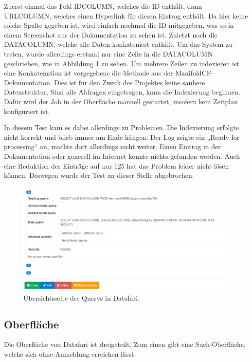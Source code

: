 Zuerst einmal das Feld IDCOLUMN, welches die ID enthält, dann URLCOLUMN, welches einen Hyperlink für diesen Eintrag enthält. Da hier keine solche Spalte gegeben ist, wird einfach nochmal die ID mitgegeben, was so in einem Screenshot aus der Dokumentation zu sehen ist. Zuletzt noch die DATACOLUMN, welche alle Daten konkateniert enthält. Um das System zu testen, wurde allerdings erstmal nur eine Zeile in die DATACOLUMN geschrieben, wie in Abbildung \ref{img:datafariQuery} zu sehen. Um mehrere Zeilen zu indexieren ist eine Konkatenation ist vorgegebene die Methode aus der ManifoldCF-Dokumentation. \cite[S.~97]{ApacheSoftwareFoundation.} Dies ist für den Zweck des Projektes keine saubere Datenstruktur.
Sind alle Abfragen eingetragen, kann die Indexierung beginnen. Dafür wird der Job in der Oberfläche manuell gestartet, insofern kein Zeitplan konfiguriert ist. \cite{datafari.25.2.2020}

In diesem Test kam es dabei allerdings zu Problemen. Die Indexierung erfolgte nicht korrekt und blieb immer am Ende hängen. Der Log zeigte ein „Ready for processing“ an, machte dort allerdings nicht weiter. Einen Eintrag in der Dokumentation oder generell im Internet konnte nichts gefunden werden. Auch eine Reduktion der Einträge auf nur 125 hat das Problem leider nicht lösen können. Deswegen wurde der Test an dieser Stelle abgebrochen. 

\begin{figure}
	\centering
	\includegraphics[width=1\linewidth]{images/datafari_query.png}
	\caption{Übersichtsseite des Querys in Datafari.}
	\label{img:datafariQuery}
\end{figure}

\subsection{Oberfläche}

Die Oberfläche von Datafari ist dreigeteilt. Zum einen gibt eine Such-Oberfläche, welche sich ohne Anmeldung erreichen lässt. 

